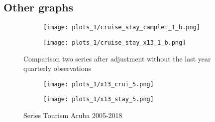 \documentclass[11pt]{article}
\begin{document}
\newpage 
\subsection{Other graphs}

\begin{figure}[H]
    \centering
        \begin{subfigure}[t]{0.45\textwidth}
         \texttt{[image: plots\_1/cruise\_stay\_camplet\_1\_b.png]}
    \end{subfigure}
    \begin{subfigure}[t]{0.45\textwidth}
          \texttt{[image: plots\_1/cruise\_stay\_x13\_1\_b.png]}
    \end{subfigure}
    \caption{Comparison two series after adjustment without the last year quarterly observations}
\end{figure}

\begin{figure}[H]
    \centering
    \begin{subfigure}[t]{0.45\textwidth}
         \texttt{[image: plots\_1/x13\_crui\_5.png]}
    \end{subfigure}
    \begin{subfigure}[t]{0.45\textwidth}
          \texttt{[image: plots\_1/x13\_stay\_5.png]}
    \end{subfigure}
    \caption{Series Tourism Aruba 2005-2018}
    \label{fig:comparison}
\end{figure}

\newpage 
\end{document}
